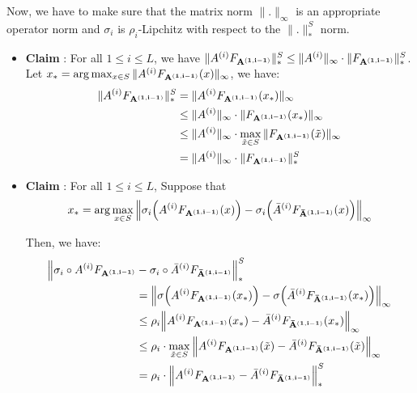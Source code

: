 \noindent Now, we have to make sure that the matrix norm $\|.\|_\infty$ is an appropriate operator norm and $\sigma_i$ is $\rho_i$-Lipchitz with respect to the $\|.\|_*^S$ norm.
\begin{itemize}
    \item \textbf{Claim} : For all $1\le i\le L$, we have $\|A^{(i)}F_{\bf A^{(1, i-1)}}\|_*^S \le \|A^{(i)}\|_\infty \cdot \|F_{\bf A^{(1, i-1)}}\|_*^S$.
    \newline Let $x_* = \arg\max_{x\in S}\|A^{(i)}F_{\bf A^{(1, i-1)}}(x)\|_\infty$, we have:
    \begin{align*}
        \|A^{(i)}F_{\bf A^{(1, i-1)}}\|_*^S &= \|A^{(i)}F_{\bf A^{(1, i-1)}}(x_*)\|_\infty \\
            &\le \|A^{(i)}\|_\infty \cdot \|F_{\bf A^{(1, i-1)}}(x_*)\|_\infty \\
            &\le \|A^{(i)}\|_\infty \cdot \max_{\tilde x\in S}\|F_{\bf A^{(1, i-1)}}(\tilde x)\|_\infty \\
            &= \|A^{(i)}\|_\infty \cdot \|F_{\bf A^{(1, i-1)}}\|_*^S
    \end{align*}

    \item \textbf{Claim} : For all $1\le i \le L$, Suppose that
    \begin{align*}
        x_* = \arg\max_{x\in S}\Big\|
            \sigma_i\Big( A^{(i)}F_{\bf A^{(1, i-1)}}(x) \Big) - \sigma_i\Big( {\bar A}^{(i)}F_{\bf {\bar A}^{(1, i-1)}}(x) \Big)
        \Big\|_\infty
    \end{align*}

    \noindent Then, we have:
    \begin{align*}
        \Big\|
            \sigma_i\circ A^{(i)}F_{\bf A^{(1, i-1)}} &- \sigma_i \circ {\bar A}^{(i)}F_{\bf {\bar A}^{(1, i-1)}}
        \Big\|_*^S \\
        &= \Big\|
            \sigma\Big( A^{(i)}F_{\bf A^{(1, i-1)}}(x_*) \Big) - \sigma\Big( {\bar A}^{(i)}F_{\bf {\bar A}^{(1, i-1)}}(x_*) \Big)
        \Big\|_\infty \\
        &\le \rho_i \Big\|
            A^{(i)}F_{\bf A^{(1, i-1)}}(x_*) - {\bar A}^{(i)}F_{\bf {\bar A}^{(1, i-1)}}(x_*)
        \Big\|_\infty \\
        &\le \rho_i \cdot \max_{\tilde x\in S}\Big\|
            A^{(i)}F_{\bf A^{(1, i-1)}}(\tilde x) - {\bar A}^{(i)}F_{\bf {\bar A}^{(1, i-1)}}(\tilde x)
        \Big\|_\infty \\
        &= \rho_i \cdot \Big\|
            A^{(i)}F_{\bf A^{(1, i-1)}} - {\bar A}^{(i)}F_{\bf {\bar A}^{(1, i-1)}}
        \Big\|_*^S
    \end{align*}
\end{itemize}

